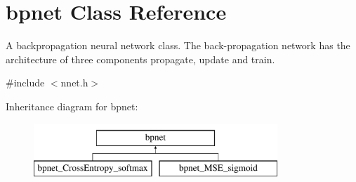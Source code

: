 \hypertarget{classbpnet}{\section{bpnet Class Reference}
\label{classbpnet}
}


A backpropagation neural network class. The back-\/propagation network has the architecture of three components propagate, update and train.  




{\ttfamily \#include $<$nnet.\-h$>$}

Inheritance diagram for bpnet\-:\begin{figure}[H]
\begin{center}
\leavevmode
\includegraphics[height=2.000000cm]{classbpnet}
\end{center}
\end{figure}
